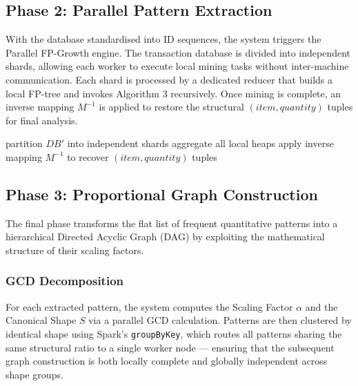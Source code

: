 \documentclass[10pt, twocolumn]{article}
\begin{document}
\subsection{Phase 2: Parallel Pattern Extraction}

With the database standardised into ID sequences, the system triggers the
Parallel FP-Growth engine. The transaction database is divided into independent
shards, allowing each worker to execute local mining tasks without
inter-machine communication. Each shard is processed by a dedicated reducer
that builds a local FP-tree and invokes Algorithm 3 recursively. Once mining
is complete, an inverse mapping $M^{-1}$ is applied to restore the structural
$(item, quantity)$ tuples for final analysis.

\begin{algorithm}[H]
    \caption{Parallel FP-Growth with Top-$K$ Filtering}

    partition $DB'$ into independent shards\;
    aggregate all local heaps\;
    apply inverse mapping $M^{-1}$ to recover $(item, quantity)$ tuples\;
    \;
\end{algorithm}

\subsection{Phase 3: Proportional Graph Construction}

The final phase transforms the flat list of frequent quantitative patterns
into a hierarchical Directed Acyclic Graph (DAG) by exploiting the
mathematical structure of their scaling factors.

\subsubsection{GCD Decomposition}

For each extracted pattern, the system computes the Scaling Factor $\alpha$
and the Canonical Shape $S$ via a parallel GCD calculation. Patterns are then
clustered by identical shape using Spark's \texttt{groupByKey}, which routes
all patterns sharing the same structural ratio to a single worker node —
ensuring that the subsequent graph construction is both locally complete and
globally independent across shape groups.
\end{document}
